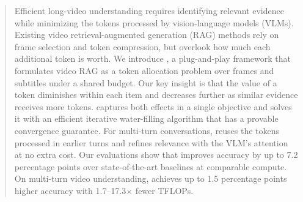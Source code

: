 \begin{abstract}
Efficient long-video understanding requires identifying relevant evidence while minimizing the tokens processed by vision-language models (VLMs). Existing video retrieval-augmented generation (RAG) methods rely on frame selection and token compression, but overlook how much each additional token is worth. We introduce \textbf{\name}, a plug-and-play framework that formulates video RAG as a token allocation problem over frames and subtitles under a shared budget. Our key insight is that the value of a token diminishes within each item and decreases further as similar evidence receives more tokens. \name captures both effects in a single objective and solves it with an efficient iterative water-filling algorithm that has a provable convergence guarantee. For multi-turn conversations, \name reuses the tokens processed in earlier turns and refines relevance with the VLM's attention at no extra cost. Our evaluations show that \name improves accuracy by up to 7.2 percentage points over state-of-the-art baselines at comparable compute. On multi-turn video understanding, \name achieves up to 1.5 percentage points higher accuracy with 1.7--17.3$\times$ fewer TFLOPs.
\end{abstract} 
